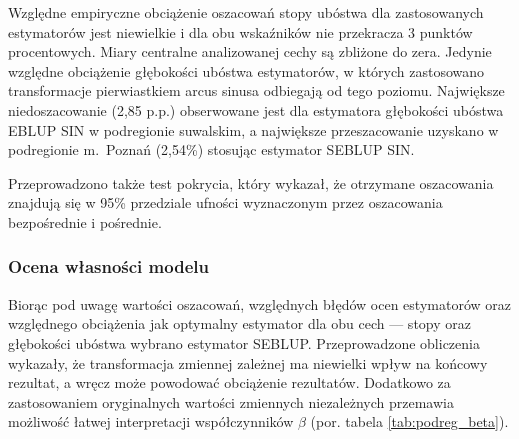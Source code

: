 Względne empiryczne obciążenie oszacowań stopy ubóstwa dla zastosowanych estymatorów jest niewielkie i dla obu wskaźników nie przekracza 3 punktów procentowych. Miary centralne analizowanej cechy są zbliżone do zera. Jedynie względne obciążenie głębokości ubóstwa estymatorów, w których zastosowano transformacje pierwiastkiem arcus sinusa odbiegają od tego poziomu. Największe niedoszacowanie (2,85 p.p.) obserwowane jest dla estymatora głębokości ubóstwa EBLUP SIN w podregionie suwalskim, a największe przeszacowanie uzyskano w podregionie m.~Poznań (2,54\%) stosując estymator SEBLUP SIN.

Przeprowadzono także test pokrycia, który wykazał, że otrzymane oszacowania znajdują się w 95\% przedziale ufności wyznaczonym przez oszacowania bezpośrednie i pośrednie.

\subsubsection{Ocena własności modelu}

Biorąc pod uwagę wartości oszacowań, względnych błędów ocen estymatorów oraz względnego obciążenia jak optymalny estymator dla obu cech --- stopy oraz głębokości ubóstwa wybrano estymator SEBLUP. Przeprowadzone obliczenia wykazały, że transformacja zmiennej zależnej ma niewielki wpływ na końcowy rezultat, a wręcz może powodować obciążenie rezultatów. Dodatkowo za zastosowaniem oryginalnych wartości zmiennych niezależnych przemawia możliwość łatwej interpretacji współczynników $\beta$ (por. tabela \ref{tab:podreg_beta}).

